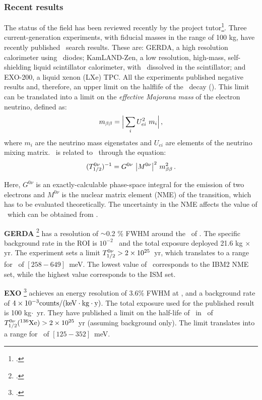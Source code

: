 \documentclass[a4paper,11pt,oneside]{article}
\begin{document}
\subsubsection*{Recent results}
The status of the field has been reviewed recently by the project tutor\footcite{INSS2014}. Three current-generation experiments, with fiducial masses in the range of 100 kg, have recently published \bbonu\ search results. These are: GERDA, a high resolution calorimeter using \GE\ diodes; KamLAND-Zen, a low resolution, high-mass, self-shielding liquid scintillator calorimeter, with \XE\ dissolved in the scintillator; and EXO-200, a liquid xenon (LXe) TPC. All the experiments published negative results and, therefore, an upper limit on the halflife of the \bbonu\ decay (\Tonu). This limit can be translated into a limit on the \emph{effective Majorana mass} of the electron neutrino, defined as:
\begin{equation}
\mbb = \Big| \sum_{i} U^{2}_{ei} \ m_{i} \Big| \, ,
\end{equation}
%
where $m_{i}$ are the neutrino mass eigenstates and $U_{ei}$ are elements of the neutrino mixing matrix. \mbb\ is related to \Tonu\ through the equation:
\begin{equation}
(T^{0\nu}_{1/2})^{-1} = G^{0\nu} \ \big|M^{0\nu}\big|^{2} \ m_{\beta\beta}^{2} \, .
\label{eq:Tonu}
\end{equation}

Here, $G^{0\nu}$ is an exactly-calculable phase-space integral for the emission of two electrons and $M^{0\nu}$ is the nuclear matrix element (NME) of the transition, which has to be evaluated theoretically. The uncertainty in the NME affects the value of \mbb\ which can be obtained from \Tonu.
 
{\bf GERDA} \footcite{Agostini:2013mzu} has a resolution of $\sim$0.2 \% FWHM around the \Qbb\ of \GE. The specific background rate in the ROI is $10^{-2}$ \ckky\ and the total exposure deployed 21.6 kg $\times$ yr. The experiment sets a limit $T_{1/2}^{0\nu} > 2 \times 10^{25}$~yr, which translates to a range for \mbb\ of $[258-649]$~meV. The lowest value of \mbb\ corresponds to the IBM2 NME set, while the highest value corresponds to the ISM set.

{\bf EXO} \footcite{Albert:2014awa} achieves an energy resolution of 3.6\% FWHM at \Qbb, and a background rate of $ 4 \times 10^{-3}\rm counts/(keV \cdot kg \cdot y)$. The total exposure used for the published result is 100 kg$\cdot$~yr. They have published a limit on the half-life of \bbonu\ in \XE\ of $T_{1/2}^{0\nu}({}^{136}\rm Xe) > 2 \times 10^{25}$~yr (assuming background only). The limit translates into a range for \mbb\ of $[125-352]$~meV.
\end{document}
